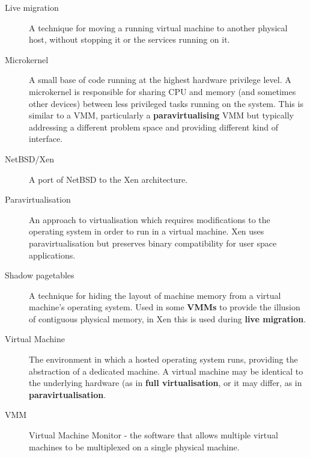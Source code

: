 \documentclass[11pt,twoside,final,openright]{report}
\begin{document}
{\begin{description}
\item[Live migration]      A technique for moving a running virtual
                           machine to another physical host, without
                           stopping it or the services running on it.

\item[Microkernel]         A small base of code running at the highest
                           hardware privilege level.  A microkernel is
                           responsible for sharing CPU and memory (and
                           sometimes other devices) between less
                           privileged tasks running on the system.
                           This is similar to a VMM, particularly a
                           {\bf paravirtualising} VMM but typically
                           addressing a different problem space and
                           providing different kind of interface.

\item[NetBSD/Xen]          A port of NetBSD to the Xen architecture.

\item[Paravirtualisation]  An approach to virtualisation which requires
                           modifications to the operating system in
                           order to run in a virtual machine.  Xen
                           uses paravirtualisation but preserves
                           binary compatibility for user space
                           applications.

\item[Shadow pagetables]   A technique for hiding the layout of machine
                           memory from a virtual machine's operating
                           system.  Used in some {\bf VMMs} to provide
                           the illusion of contiguous physical memory,
                           in Xen this is used during
                           {\bf live migration}.

\item[Virtual Machine]     The environment in which a hosted operating
                           system runs, providing the abstraction of a
                           dedicated machine.  A virtual machine may
                           be identical to the underlying hardware (as
                           in {\bf full virtualisation}, or it may
                           differ, as in {\bf paravirtualisation}.

\item[VMM]                 Virtual Machine Monitor - the software that
                           allows multiple virtual machines to be
                           multiplexed on a single physical machine.


\end{description}}
\end{document}
